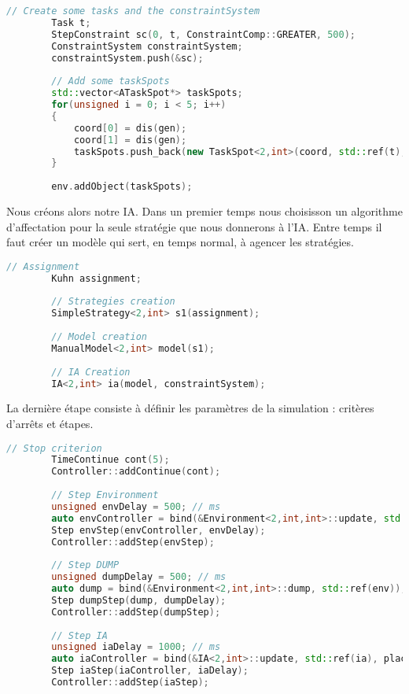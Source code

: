 \begin{lstlisting}[label=nvi_code,caption=Création des tâches, contraintes et emplacements,language=C++]        
        // Create some tasks and the constraintSystem
        Task t;
        StepConstraint sc(0, t, ConstraintComp::GREATER, 500);
        ConstraintSystem constraintSystem;
        constraintSystem.push(&sc);
        
        // Add some taskSpots
        std::vector<ATaskSpot*> taskSpots;
        for(unsigned i = 0; i < 5; i++)
        {
            coord[0] = dis(gen);
            coord[1] = dis(gen);
            taskSpots.push_back(new TaskSpot<2,int>(coord, std::ref(t), [](int& i, double _time){ return i+0.001*_time; }));
        }
        
        env.addObject(taskSpots);
\end{lstlisting}

Nous créons alors notre IA. Dans un premier temps nous choisisson un algorithme d'affectation pour la seule stratégie que nous donnerons à l'IA. Entre temps il faut créer un modèle qui sert, en temps normal, à agencer les stratégies.

\begin{lstlisting}[label=nvi_code,caption=Déclaration de l'IA,language=C++]         
        // Assignment
        Kuhn assignment;
        
        // Strategies creation
        SimpleStrategy<2,int> s1(assignment);
        
        // Model creation
        ManualModel<2,int> model(s1);
        
        // IA Creation
        IA<2,int> ia(model, constraintSystem);
\end{lstlisting}
 
La dernière étape consiste à définir les paramètres de la simulation : critères d'arrêts et étapes.
 
\begin{lstlisting}[label=nvi_code,caption=Paramètrage de la simulation,language=C++]         
        // Stop criterion
        TimeContinue cont(5);
        Controller::addContinue(cont);
        
        // Step Environment
        unsigned envDelay = 500; // ms
        auto envController = bind(&Environment<2,int,int>::update, std::ref(env), placeholders::_1);
        Step envStep(envController, envDelay);
        Controller::addStep(envStep);
        
        // Step DUMP
        unsigned dumpDelay = 500; // ms
        auto dump = bind(&Environment<2,int,int>::dump, std::ref(env));
        Step dumpStep(dump, dumpDelay);
        Controller::addStep(dumpStep);
        
        // Step IA
        unsigned iaDelay = 1000; // ms
        auto iaController = bind(&IA<2,int>::update, std::ref(ia), placeholders::_1);
        Step iaStep(iaController, iaDelay);
        Controller::addStep(iaStep);
\end{lstlisting}

